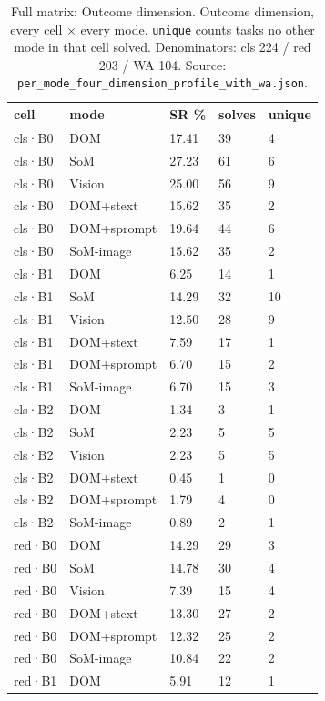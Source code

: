 \begin{table}[tp]
\centering
\caption{Full matrix: Outcome dimension. Outcome dimension, every cell × every mode. \texttt{unique} counts tasks no other mode in that cell solved. Denominators: cls 224 / red 203 / WA 104. Source: \texttt{per\_mode\_four\_dimension\_profile\_with\_wa.json}.}
\label{tab:t06}
\footnotesize
\setlength{\tabcolsep}{3pt}
\begin{tabular}{@{}lllll@{}}
\toprule
cell & mode & SR \% & solves & unique \\
\midrule
cls·B0 & DOM & 17.41 & 39 & 4 \\
cls·B0 & SoM & 27.23 & 61 & 6 \\
cls·B0 & Vision & 25.00 & 56 & 9 \\
cls·B0 & DOM+\allowbreak{}stext & 15.62 & 35 & 2 \\
cls·B0 & DOM+\allowbreak{}sprompt & 19.64 & 44 & 6 \\
cls·B0 & SoM-image & 15.62 & 35 & 2 \\
cls·B1 & DOM & 6.25 & 14 & 1 \\
cls·B1 & SoM & 14.29 & 32 & 10 \\
cls·B1 & Vision & 12.50 & 28 & 9 \\
cls·B1 & DOM+\allowbreak{}stext & 7.59 & 17 & 1 \\
cls·B1 & DOM+\allowbreak{}sprompt & 6.70 & 15 & 2 \\
cls·B1 & SoM-image & 6.70 & 15 & 3 \\
cls·B2 & DOM & 1.34 & 3 & 1 \\
cls·B2 & SoM & 2.23 & 5 & 5 \\
cls·B2 & Vision & 2.23 & 5 & 5 \\
cls·B2 & DOM+\allowbreak{}stext & 0.45 & 1 & 0 \\
cls·B2 & DOM+\allowbreak{}sprompt & 1.79 & 4 & 0 \\
cls·B2 & SoM-image & 0.89 & 2 & 1 \\
red·B0 & DOM & 14.29 & 29 & 3 \\
red·B0 & SoM & 14.78 & 30 & 4 \\
red·B0 & Vision & 7.39 & 15 & 4 \\
red·B0 & DOM+\allowbreak{}stext & 13.30 & 27 & 2 \\
red·B0 & DOM+\allowbreak{}sprompt & 12.32 & 25 & 2 \\
red·B0 & SoM-image & 10.84 & 22 & 2 \\
red·B1 & DOM & 5.91 & 12 & 1 \\

\end{tabular}
\end{table}
